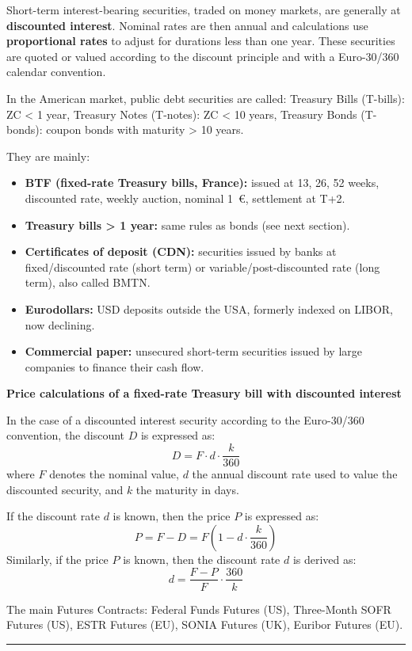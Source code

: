 \begin{f}
Short-term interest-bearing securities, traded on money markets, are generally at \textbf{discounted interest}. 
Nominal rates are then annual and calculations use \textbf{proportional rates} to adjust for durations less than one year.
These securities are quoted or valued according to the discount principle and with a Euro-30/360 calendar convention.

In the American market, public debt securities are called:
Treasury Bills (T-bills): ZC < 1 year, Treasury Notes (T-notes): ZC < 10 years,
Treasury Bonds (T-bonds): coupon bonds with maturity > 10 years.


They are mainly:
\begin{itemize}
	\item \textbf{BTF (fixed-rate Treasury bills, France):} issued at 13, 26, 52 weeks, discounted rate, weekly auction, nominal 1~€, settlement at T+2.
	
	\item \textbf{Treasury bills > 1 year:} same rules as bonds (see next section).
	
	\item \textbf{Certificates of deposit (CDN):} securities issued by banks at fixed/discounted rate (short term) or variable/post-discounted rate (long term), also called BMTN.
	
	\item \textbf{Eurodollars:} USD deposits outside the USA, formerly indexed on LIBOR, now declining.
	
	\item \textbf{Commercial paper:} unsecured short-term securities issued by large companies to finance their cash flow.
\end{itemize}

\textbf{Price calculations of a fixed-rate Treasury bill with discounted interest}

In the case of a discounted interest security according to the Euro-30/360 convention, the discount \(D\) is expressed as:
\[
D=F \cdot d \cdot \frac{k}{360}
\]
where \(F\) denotes the nominal value, \(d\) the annual discount rate used to value the discounted security, and \(k\) the maturity in days.

If the discount rate \(d\) is known, then the price \(P\) is expressed as:
\[
P=F-D=F\left(1-d \cdot \frac{k}{360}\right)
\]
Similarly, if the price \(P\) is known, then the discount rate \(d\) is derived as:
\[
d=\frac{F-P}{F} \cdot \frac{360}{k}
\]


The main Futures Contracts: Federal Funds Futures (US),
Three-Month SOFR Futures (US),
ESTR Futures (EU),
SONIA Futures (UK),
Euribor Futures (EU).

\end{f}
\hrule



